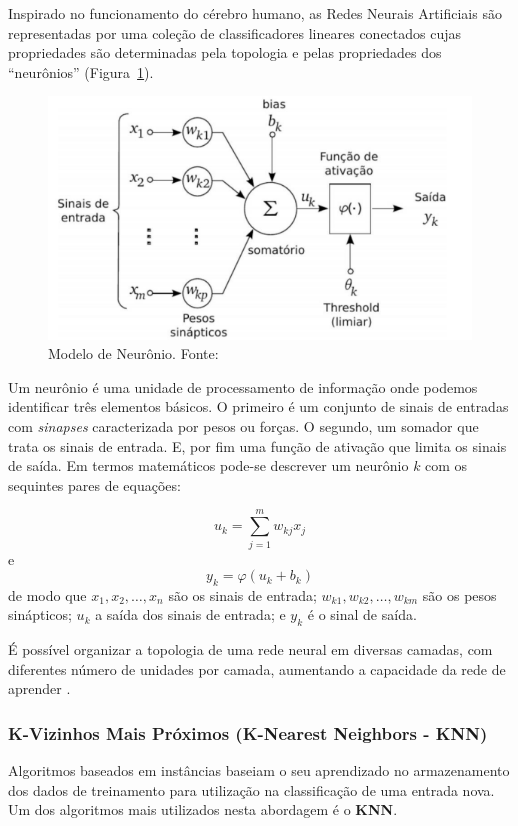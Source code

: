 \documentclass[12pt]{article}
\begin{document}
Inspirado no funcionamento do cérebro humano, as Redes Neurais Artificiais são representadas por uma coleção de classificadores lineares conectados cujas propriedades são determinadas pela topologia e pelas propriedades dos ``neurônios'' (Figura~\ref{fig_neuronio}).

\begin{figure}[h]
  \centering
  \includegraphics[width=.4\textwidth]{img/fig_neuronio.png}
  \caption{Modelo de Neurônio. Fonte: \cite{haykin:2001}}
  \label{fig_neuronio}
\end{figure}

Um neurônio é uma unidade de processamento de informação onde podemos identificar três elementos básicos. O primeiro é um conjunto de sinais de entradas com \textit{sinapses} caracterizada por pesos ou forças. O segundo, um somador que trata os sinais de entrada. E, por fim uma função de ativação que limita os sinais de saída. Em termos matemáticos pode-se descrever um neurônio $k$ com os sequintes pares de equações:

\begin{equation}
  u_k = \sum_{j = 1}^{m} w_{kj}x_j
\end{equation}
e
\begin{equation}
  y_k = \varphi (u_k + b_k)
\end{equation}
de modo que $x_1, x_2, \ldots, x_n$ são os sinais de entrada; $w_{k1}, w_{k2}, \ldots, w_{km}$ são os pesos sinápticos; $u_k$ a saída dos sinais de entrada; e $y_k$ é o sinal de saída.

É possível organizar a topologia de uma rede neural em diversas camadas, com diferentes número de unidades por camada, aumentando a capacidade da rede de aprender \cite{haykin:2001}.

\subsubsection{K-Vizinhos Mais Próximos (\textbf{K-Nearest Neighbors - KNN})}

Algoritmos baseados em instâncias baseiam o seu aprendizado no armazenamento dos dados de treinamento para utilização na classificação de uma entrada nova. Um dos algoritmos mais utilizados nesta abordagem é o \textbf{KNN}.
\end{document}
